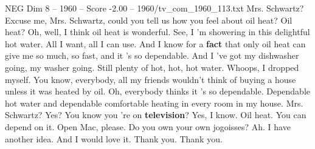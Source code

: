 \begin{textsample}{NEG Dim 8 – 1960 – Score -2.00 – 1960/tv\_com\_1960\_113.txt}  \label{ex:f8_neg_031}
Mrs.
Schwartz?
Excuse me, Mrs.
Schwartz, could you tell us how you feel about oil heat?
Oil heat?
Oh, well, I think oil heat is wonderful.
See, I 'm showering in this delightful hot water.
All I want, all I can use.
And I know for a \textbf{fact} that only oil heat can give me so much, so fast, and it 's so dependable.
And I 've got my dishwasher going, my washer going.
Still plenty of hot, hot, hot water.
Whoops, I dropped myself.
You know, everybody, all my friends wouldn't think of buying a house unless it was heated by oil.
Oh, everybody thinks it 's so dependable.
Dependable hot water and dependable comfortable heating in every room in my house.
Mrs.
Schwartz?
Yes?
You know you 're on \textbf{television}?
Yes, I know.
Oil heat.
You can depend on it.
Open Mac, please.
Do you own your own jogoisses?
Ah.
I have another idea.
And I would love it.
Thank you.
Thank you.

\end{textsample}
